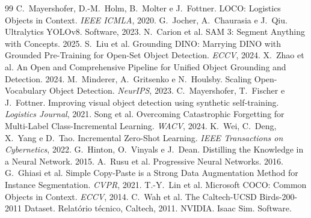 \documentclass[11pt,a4paper]{article}
\begin{document}
\begin{thebibliography}{99}
 C.~Mayershofer, D.-M.~Holm, B.~Molter e J.~Fottner.
  LOCO: Logistics Objects in Context. \emph{IEEE ICMLA}, 2020.
 G.~Jocher, A.~Chaurasia e J.~Qiu. Ultralytics YOLOv8. Software, 2023.
 N.~Carion et al. SAM 3: Segment Anything with Concepts. 2025.
 S.~Liu et al. Grounding DINO: Marrying DINO with Grounded
  Pre-Training for Open-Set Object Detection. \emph{ECCV}, 2024.
 X.~Zhao et al. An Open and Comprehensive Pipeline for Unified
  Object Grounding and Detection. 2024.
 M.~Minderer, A.~Gritsenko e N.~Houlsby. Scaling Open-Vocabulary
  Object Detection. \emph{NeurIPS}, 2023.
 C.~Mayershofer, T.~Fischer e J.~Fottner. Improving visual
  object detection using synthetic self-training. \emph{Logistics Journal}, 2021.
 Song et al. Overcoming Catastrophic Forgetting for Multi-Label
  Class-Incremental Learning. \emph{WACV}, 2024.
 K.~Wei, C.~Deng, X.~Yang e D.~Tao. Incremental Zero-Shot Learning.
  \emph{IEEE Transactions on Cybernetics}, 2022.
 G.~Hinton, O.~Vinyals e J.~Dean. Distilling the Knowledge in a
  Neural Network. 2015.
 A.~Rusu et al. Progressive Neural Networks. 2016.
 G.~Ghiasi et al. Simple Copy-Paste is a Strong Data
  Augmentation Method for Instance Segmentation. \emph{CVPR}, 2021.
 T.-Y.~Lin et al. Microsoft COCO: Common Objects in Context.
  \emph{ECCV}, 2014.
 C.~Wah et al. The Caltech-UCSD Birds-200-2011 Dataset. Relatório
  técnico, Caltech, 2011.
 NVIDIA. Isaac Sim. Software.
\end{thebibliography}
\end{document}
